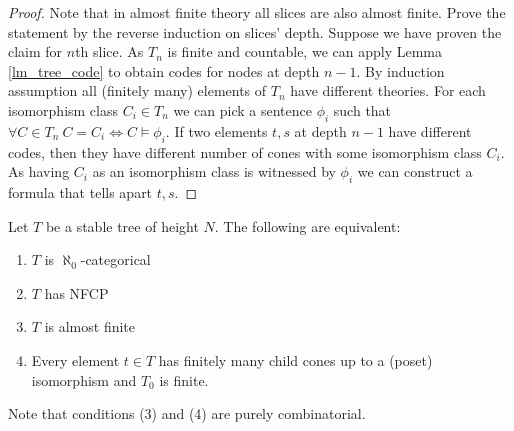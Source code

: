 \documentclass{amsart}
\begin{document}
\begin{proof}
	Note that in almost finite theory all slices are also almost finite. Prove the statement by the reverse induction on slices' depth. Suppose we have proven the claim for $n$th slice. As $T_n$ is finite and countable, we can apply Lemma \ref{lm_tree_code} to obtain codes for nodes at depth $n-1$. By induction assumption all (finitely many) elements of $T_n$ have different theories. For each isomorphism class $C_i \in T_n$ we can pick a sentence $\phi_i$ such that $\forall C \in T_n \  C = C_i \iff C \models \phi_i$. If two elements $t,s$ at depth $n-1$ have different codes, then they have different number of cones with some isomorphism class $C_i$. As having $C_i$ as an isomorphism class is witnessed by $\phi_i$ we can construct a formula that tells apart $t,s$.
\end{proof}

\begin{Theorem}
	Let $T$ be a stable tree of height $N$. The following are equivalent:
	\begin{enumerate}
		\item $T$ is $\aleph_0$-categorical
		\item $T$ has NFCP
		\item $T$ is almost finite
		\item Every element $t \in T$ has finitely many child cones up to a (poset) isomorphism and $T_0$ is finite.
	\end{enumerate}
\end{Theorem}

Note that conditions (3) and (4) are purely combinatorial.
\end{document}
